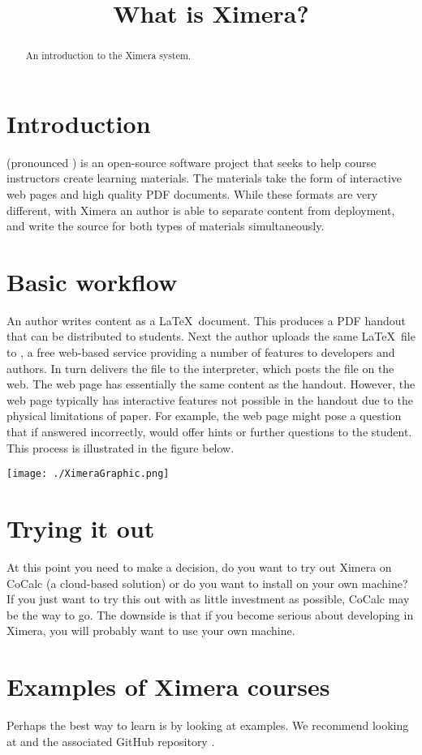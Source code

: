 \documentclass{ximera}
\title{What is Ximera?}
\begin{document}
\begin{abstract}
An introduction to the Ximera system.
\end{abstract}
\maketitle


\section{Introduction}

 (pronounced ) is an
open-source software project that seeks to help course instructors
create learning materials.  The materials take the form of interactive
web pages and high quality PDF documents.  While these formats are
very different, with Ximera an author is able to separate content from
deployment, and write the source for both types of materials
simultaneously.

\section{Basic workflow}

An author writes content as a \LaTeX\ document.  This produces a PDF
handout that can be distributed to students.  Next the author uploads
the same \LaTeX\ file to , a free
web-based service providing a number of features to developers and
authors.  In turn  delivers the
file to the  interpreter, which
posts the file on the web.  The web page has essentially the same
content as the handout.  However, the web page typically has
interactive features not possible in the handout due to the physical
limitations of paper.  For example, the web page might pose a question
that if answered incorrectly, would offer hints or further questions
to the student.  This process is illustrated in the figure below.

\begin{image}
\texttt{[image: ./XimeraGraphic.png]}
\end{image}

\section{Trying it out}

At this point you need to make a decision, do you want to try out
Ximera on CoCalc (a cloud-based solution) or do you want to install
on your own machine?  If you just want to try this out with as little
investment as possible, CoCalc may be the way to go. The downside is
that if you become serious about developing in Ximera, you will
probably want to use your own machine.

\section{Examples of Ximera courses}

Perhaps the best way to learn is by looking at examples. We recommend
looking at  and the
associated GitHub repository .
\end{document}

